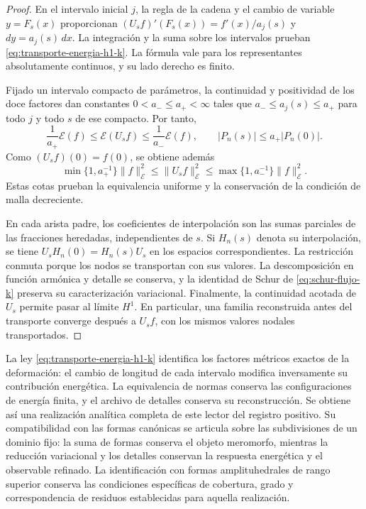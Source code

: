 \documentclass[a4paper,10pt]{article}
\theoremstyle{definition}\newtheorem{definition}[theorem]{Definición}
\theoremstyle{remark}\newtheorem{remark}[theorem]{Observación}
\numberwithin{equation}{section}
\begin{document}
\begin{proof}
En el intervalo inicial \(j\), la regla de la cadena y el cambio
de variable \(y=F_s(x)\) proporcionan
\((U_sf)'(F_s(x))=f'(x)/a_j(s)\) y \(dy=a_j(s)\,dx\).
La integración y la suma sobre los intervalos prueban
\eqref{eq:transporte-energia-h1-k}. La fórmula vale para los
representantes absolutamente continuos, y su lado derecho es finito.

Fijado un intervalo compacto de parámetros, la continuidad y positividad
de los doce factores dan constantes \(0<a_-\leq a_+<\infty\)
tales que \(a_-\leq a_j(s)\leq a_+\) para todo \(j\) y
todo \(s\) de ese compacto. Por tanto,
\[
 \frac1{a_+}\mathcal E(f)
 \leq\mathcal E(U_sf)
 \leq\frac1{a_-}\mathcal E(f),
 \qquad
 |P_n(s)|\leq a_+|P_n(0)|.
\]
Como \((U_sf)(0)=f(0)\), se obtiene además
\[
 \min\{1,a_+^{-1}\}\|f\|_{\mathcal E}^2
 \leq\|U_sf\|_{\mathcal E}^2
 \leq\max\{1,a_-^{-1}\}\|f\|_{\mathcal E}^2.
\]
Estas cotas prueban la equivalencia uniforme y la conservación de la
condición de malla decreciente.

En cada arista padre, los coeficientes de interpolación son las sumas
parciales de las fracciones heredadas, independientes de \(s\).
Si \(H_n(s)\) denota su interpolación, se tiene
\(U_sH_n(0)=H_n(s)U_s\) en los espacios correspondientes.
La restricción conmuta porque los nodos se transportan con sus valores.
La descomposición en función armónica y detalle se conserva, y la
identidad de Schur de \eqref{eq:schur-flujo-k} preserva su
caracterización variacional. Finalmente, la continuidad acotada de
\(U_s\) permite pasar al límite \(H^1\). En particular, una
familia reconstruida antes del transporte converge después a \(U_sf\),
con los mismos valores nodales transportados.
\end{proof}

La ley \eqref{eq:transporte-energia-h1-k} identifica los factores
métricos exactos de la deformación: el cambio de longitud de cada
intervalo modifica inversamente su contribución energética. La
equivalencia de normas conserva las configuraciones de energía finita,
y el archivo de detalles conserva su reconstrucción. Se obtiene así una
realización analítica completa de este lector del registro positivo.
Su compatibilidad con las formas canónicas se articula sobre las
subdivisiones de un dominio fijo: la suma de formas conserva el objeto
meromorfo, mientras la reducción variacional y los detalles conservan
la respuesta energética y el observable refinado. La identificación
con formas amplituhedrales de rango superior conserva las condiciones
específicas de cobertura, grado y correspondencia de residuos
establecidas para aquella realización.
\end{document}
